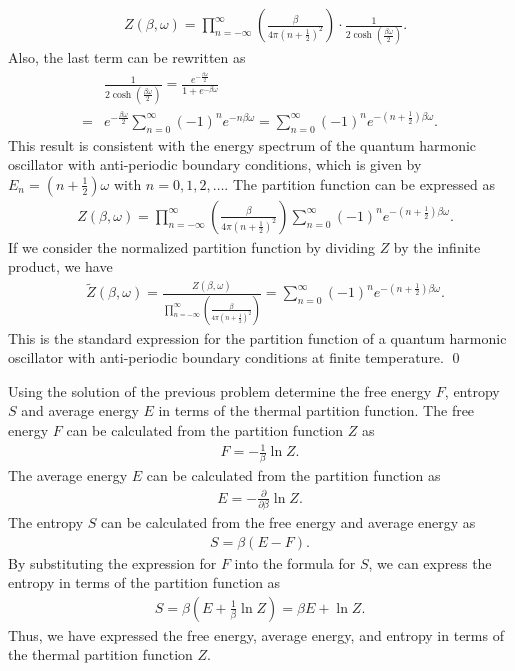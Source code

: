 \begin{align}
    &Z(\beta, \omega) = \prod_{n=-\infty}^{\infty} \left( \frac{\beta}{4\pi (n+\frac{1}{2})^2} \right) \cdot \frac{1}{2\cosh\left( \frac{\beta \omega}{2} \right)}.
\end{align}
Also, the last term can be rewritten as 
\begin{align}
    &\frac{1}{2\cosh\left( \frac{\beta \omega}{2} \right)} = \frac{e^{-\frac{\beta \omega}{2}}}{1 + e^{-\beta \omega}}\\
    =& e^{-\frac{\beta \omega}{2}} \sum_{n=0}^{\infty} (-1)^n e^{-n \beta \omega} = \sum_{n=0}^{\infty} (-1)^n e^{-\left( n + \frac{1}{2} \right) \beta \omega}.
\end{align}
This result is consistent with the energy spectrum of the quantum harmonic oscillator with anti-periodic boundary conditions, which is given by $E_n = \left( n + \frac{1}{2} \right) \omega$ with $n = 0, 1, 2, \ldots$. The partition function can be expressed as
\begin{align}
    &Z(\beta, \omega) = \prod_{n=-\infty}^{\infty} \left( \frac{\beta}{4\pi (n+\frac{1}{2})^2} \right) \sum_{n=0}^{\infty} (-1)^n e^{-\left( n + \frac{1}{2} \right) \beta \omega}.
\end{align}
If we consider the normalized partition function by dividing $Z$ by the infinite product, we have
\begin{align}
    &\tilde{Z}(\beta, \omega) = \frac{Z(\beta, \omega)}{\prod_{n=-\infty}^{\infty} \left( \frac{\beta}{4\pi (n+\frac{1}{2})^2} \right)} = \sum_{n=0}^{\infty} (-1)^n e^{-\left( n + \frac{1}{2} \right) \beta \omega}.
\end{align}
This is the standard expression for the partition function of a quantum harmonic oscillator with anti-periodic boundary conditions at finite temperature.
\qed


\clearpage
{}
Using the solution of the previous problem determine the free energy $F$, entropy $S$ and average energy $E$ in terms of the thermal partition function.
\answer{}
The free energy $F$ can be calculated from the partition function $Z$ as
\begin{align}
    F = -\frac{1}{\beta} \ln Z.
\end{align}
The average energy $E$ can be calculated from the partition function as
\begin{align}   
    E = -\frac{\partial}{\partial \beta} \ln Z.
\end{align}
The entropy $S$ can be calculated from the free energy and average energy as
\begin{align}
    S = \beta (E - F).
\end{align}
By substituting the expression for $F$ into the formula for $S$, we can express the entropy in terms of the partition function as
\begin{align}
    S = \beta \left( E + \frac{1}{\beta} \ln Z \right) = \beta E + \ln Z.
\end{align}
Thus, we have expressed the free energy, average energy, and entropy in terms of the thermal partition function $Z$.    



